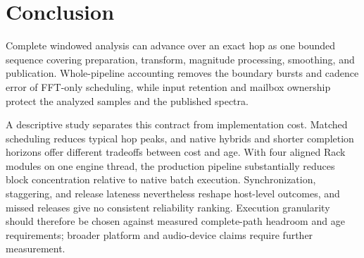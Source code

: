 \section{Conclusion}
Complete windowed analysis can advance over an exact hop as one bounded
sequence covering preparation, transform, magnitude processing, smoothing, and
publication. Whole-pipeline accounting removes the boundary bursts and cadence
error of FFT-only scheduling, while input retention and mailbox ownership
protect the analyzed samples and the published spectra.

A descriptive study separates this contract from implementation cost. Matched
scheduling reduces typical hop peaks, and native hybrids and shorter
completion horizons offer different tradeoffs between cost and age. With four
aligned Rack modules on one engine thread, the production pipeline
substantially reduces block concentration relative to native batch execution.
Synchronization, staggering, and release lateness nevertheless reshape
host-level outcomes, and missed releases give no consistent reliability
ranking. Execution granularity should therefore be chosen against measured
complete-path headroom and age requirements; broader platform and
audio-device claims require further measurement.
